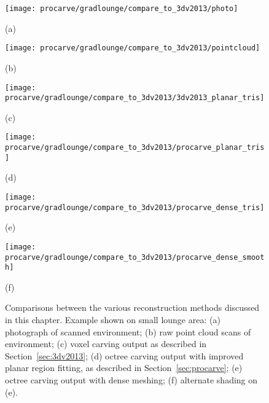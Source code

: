 \documentclass[12pt,onecolumn,oneside]{book}
\begin{document}
\begin{figure}
	
	\centering

	\begin{minipage}[b]{0.45\linewidth}
	\centerline{\texttt{[image: procarve/gradlounge/compare\_to\_3dv2013/photo]}}
	\centerline{(a)}\medskip
	\end{minipage}
	\hfill
	\begin{minipage}[b]{0.45\linewidth}
	\centerline{\texttt{[image: procarve/gradlounge/compare\_to\_3dv2013/pointcloud]}}
	\centerline{(b)}\medskip
	\end{minipage}

	\begin{minipage}[b]{0.45\linewidth}
	\centerline{\texttt{[image: procarve/gradlounge/compare\_to\_3dv2013/3dv2013\_planar\_tris]}}
	\centerline{(c)}\medskip
	\end{minipage}
	\hfill
	\begin{minipage}[b]{0.45\linewidth}
	\centerline{\texttt{[image: procarve/gradlounge/compare\_to\_3dv2013/procarve\_planar\_tris]}}
	\centerline{(d)}\medskip
	\end{minipage}

	\begin{minipage}[b]{0.45\linewidth}
	\centerline{\texttt{[image: procarve/gradlounge/compare\_to\_3dv2013/procarve\_dense\_tris]}}
	\centerline{(e)}\medskip
	\end{minipage}
	\hfill
	\begin{minipage}[b]{0.45\linewidth}
	\centerline{\texttt{[image: procarve/gradlounge/compare\_to\_3dv2013/procarve\_dense\_smooth]}}
	\centerline{(f)}\medskip
	\end{minipage}

	\caption[Comparison between region fitting methods.]{Comparisons between the various reconstruction methods discussed in this chapter.  Example shown on small lounge area:  (a) photograph of scanned environment; (b) raw point cloud scans of environment; (c) voxel carving output as described in Section~\ref{sec:3dv2013}; (d) octree carving output with improved planar region fitting, as described in Section~\ref{sec:procarve}; (e) octree carving output with dense meshing; (f) alternate shading on (e).}
	\label{fig:gradlounge_procarve_compare}
\end{figure}
\end{document}
